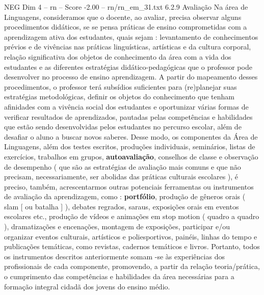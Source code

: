 \begin{textsample}{NEG Dim 4 – rn – Score -2.00 – rn/rn\_em\_31.txt}  \label{ex:f4_neg_203}
6.2.9 Avaliação Na área de Linguagens, consideramos que o docente, ao avaliar, precisa observar alguns procedimentos didáticos, se se pensa práticas de ensino comprometidas com a aprendizagem ativa dos estudantes, quais sejam : levantamento de conhecimentos prévios e de vivências nas práticas linguísticas, artísticas e da cultura corporal, relação significativa dos objetos de conhecimento da área com a vida dos estudantes e as diferentes estratégias didático-pedagógicas que o professor pode desenvolver no processo de ensino aprendizagem.
A partir do mapeamento desses procedimentos, o professor terá subsídios suficientes para (re)planejar suas estratégias metodológicas, definir os objetos do conhecimento que tenham afinidades com a vivência social dos estudantes e oportunizar várias formas de verificar resultados de aprendizados, pautadas pelas competências e habilidades que estão sendo desenvolvidas pelos estudantes no percurso escolar, além de desafiar o aluno a buscar novos saberes.
Desse modo, os componentes da Área de Linguagens, além dos testes escritos, produções individuais, seminários, listas de exercícios, trabalhos em grupos, \textbf{autoavaliação}, conselhos de classe e observação de desempenho ( que são as estratégias de avaliação mais comuns e que não precisam, necessariamente, ser abolidas das práticas culturais escolares ), é preciso, também, acrescentarmos outras potenciais ferramentas ou instrumentos de avaliação da aprendizagem, como : \textbf{portfólio}, produção de gêneros orais ( slam [ ou batalha ] ), debates regrados, saraus, exposições orais em eventos escolares etc., produção de vídeos e animações em stop motion ( quadro a quadro ), dramatizações e encenações, montagem de exposições, participar e/ou organizar eventos culturais, artísticos e poliesportivos, painéis, linhas do tempo e publicações temáticas, como revistas, cadernos temáticos e livros.
Portanto, todos os instrumentos descritos anteriormente somam -se às experiências dos profissionais de cada componente, promovendo, a partir da relação teoria/prática, o cumprimento das competências e habilidades da área necessárias para a formação integral cidadã dos jovens do ensino médio.

\end{textsample}
